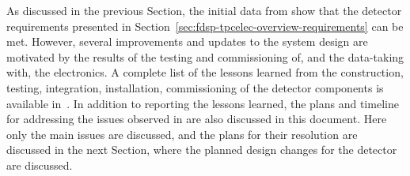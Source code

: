 As discussed in the previous Section, the initial data from 
show that the  detector requirements presented in 
Section~\ref{sec:fdsp-tpcelec-overview-requirements} can be met.
However, several improvements and updates to the  system design 
are motivated by the results of the testing and commissioning of, and 
the data-taking with, the  electronics. A complete list
of the lessons learned from the construction, testing, integration,
installation, commissioning of the  detector components
is available in~\cite{bib:docdb12367}. In addition to reporting the
lessons learned, the plans and timeline for addressing the issues 
observed in  are also discussed in this document. Here
only the main issues are discussed, and the plans for their resolution
are discussed in the next Section, where the planned design changes
for the  detector are discussed.

